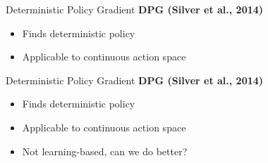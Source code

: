 \begin{frame}{Deterministic Policy Gradient}
\vspace{1em}
\textbf{DPG (Silver et al., 2014)}
\begin{itemize}
    \item[--] Finds deterministic policy
    \item[--] Applicable to continuous action space
\end{itemize}
\end{frame}

\begin{frame}{Deterministic Policy Gradient}
\vspace{1em}
\textbf{DPG (Silver et al., 2014)}
\begin{itemize}
    \item[--] Finds deterministic policy
    \item[--] Applicable to continuous action space
    \vspace{0.5em}
    \item[--] Not learning-based, can we do better?
\end{itemize}
\end{frame}
